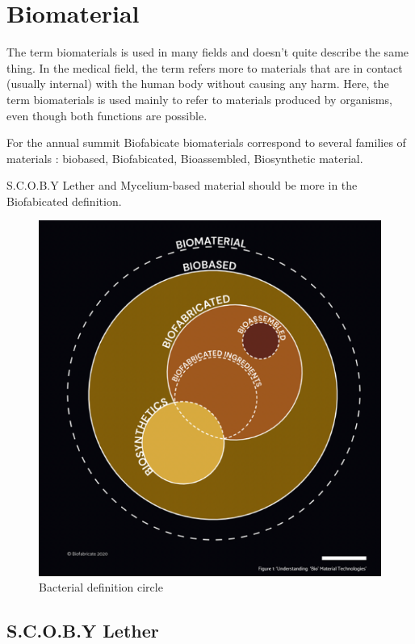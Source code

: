 \section{Biomaterial}

The term biomaterials is used in many fields and doesn't quite describe the same thing. In the medical field, the term refers more to materials that are in contact (usually internal) with the human body without causing any harm. Here, the term biomaterials is used mainly to refer to materials produced by organisms, even though both functions are possible.

For the annual summit Biofabicate biomaterials correspond to several families of materials : 
biobased, Biofabicated, Bioassembled, Biosynthetic material. 

S.C.O.B.Y Lether and Mycelium-based material should be more in the Biofabicated definition. 

\begin{figure}[h] 
    \centering
    \includegraphics{images/defcircle.png}
    \caption{Bacterial definition circle}
    \label{fig:defcircle}
\end{figure}

\subsection{S.C.O.B.Y Lether} 

